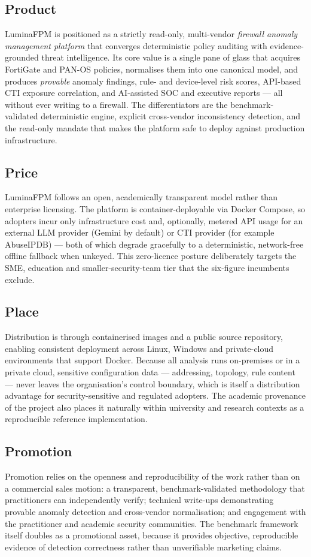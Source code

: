 \subsection{Product}
LuminaFPM is positioned as a strictly read-only, multi-vendor \emph{firewall anomaly management platform} that converges deterministic policy auditing with evidence-grounded threat intelligence. Its core value is a single pane of glass that acquires FortiGate and PAN-OS policies, normalises them into one canonical model, and produces \emph{provable} anomaly findings, rule- and device-level risk scores, API-based CTI exposure correlation, and AI-assisted SOC and executive reports --- all without ever writing to a firewall. The differentiators are the benchmark-validated deterministic engine, explicit cross-vendor inconsistency detection, and the read-only mandate that makes the platform safe to deploy against production infrastructure.

\subsection{Price}
LuminaFPM follows an open, academically transparent model rather than enterprise licensing. The platform is container-deployable via Docker Compose, so adopters incur only infrastructure cost and, optionally, metered API usage for an external LLM provider (Gemini by default) or CTI provider (for example AbuseIPDB) --- both of which degrade gracefully to a deterministic, network-free offline fallback when unkeyed. This zero-licence posture deliberately targets the SME, education and smaller-security-team tier that the six-figure incumbents exclude.

\subsection{Place}
Distribution is through containerised images and a public source repository, enabling consistent deployment across Linux, Windows and private-cloud environments that support Docker. Because all analysis runs on-premises or in a private cloud, sensitive configuration data --- addressing, topology, rule content --- never leaves the organisation's control boundary, which is itself a distribution advantage for security-sensitive and regulated adopters. The academic provenance of the project also places it naturally within university and research contexts as a reproducible reference implementation.

\subsection{Promotion}
Promotion relies on the openness and reproducibility of the work rather than on a commercial sales motion: a transparent, benchmark-validated methodology that practitioners can independently verify; technical write-ups demonstrating provable anomaly detection and cross-vendor normalisation; and engagement with the practitioner and academic security communities. The benchmark framework itself doubles as a promotional asset, because it provides objective, reproducible evidence of detection correctness rather than unverifiable marketing claims.

